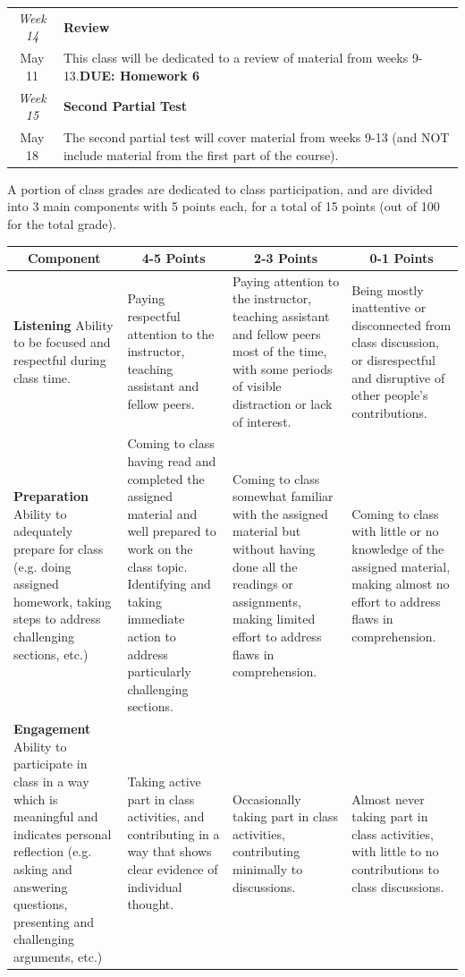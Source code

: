\documentclass[12pt]{article}
\begin{document}
\begin{tabularx}{\textwidth}[c]{| c X |}
	\textit{Week 14} & \textbf{Review} \\ May 11 & This class will be dedicated to a review of material from weeks 9-13.\newline \textbf{DUE: Homework 6}\\ \hline
	\textit{Week 15} & \textbf{Second Partial Test} \\ May 18 & The second partial test will cover material from weeks 9-13 (and NOT include material from the first part of the course).\\ \hline
\end{tabularx}
	

\clearpage

A portion of class grades are dedicated to class participation, and are divided into 3 main components with 5 points each, for a total of 15 points (out of 100 for the total grade). \newline

\noindent\begin{tabularx}{\textwidth}[c]{|X|X|X|X|}
\hline
 \multicolumn{1}{|c|}{\textbf{Component}} & \multicolumn{1}{c|}{\textbf{4-5 Points}} &  \multicolumn{1}{c|}{\textbf{2-3 Points}} &  \multicolumn{1}{c|}{\textbf{0-1 Points}}\\
\hline
\textbf{Listening} \newline Ability to be focused and respectful during class time. & Paying respectful attention to the instructor, teaching assistant and fellow peers. & Paying attention to the instructor, teaching assistant and fellow peers most of the time, with some periods of visible distraction or lack of interest. & Being mostly inattentive or disconnected from class discussion, or disrespectful and disruptive of other people's contributions.\\
\hline
\textbf{Preparation} \newline Ability to adequately prepare for class (e.g. doing assigned homework, taking steps to address challenging sections, etc.) & Coming to class having read and completed the assigned material and well prepared to work on the class topic. Identifying and taking immediate action to address particularly challenging sections. & Coming to class somewhat familiar with the assigned material but without having done all the readings or assignments, making limited effort to address flaws in comprehension. & Coming to class with little or no knowledge of the assigned material, making almost no effort to address flaws in comprehension.\\
\hline
\textbf{Engagement} \newline Ability to participate in class in a way which is meaningful and indicates personal reflection (e.g. asking and answering questions, presenting and challenging arguments, etc.) & Taking active part in class activities, and contributing in a way that shows clear evidence of individual thought. & Occasionally taking part in class activities, contributing minimally to discussions. & Almost never taking part in class activities, with little to no contributions to class discussions.\\
\hline
\end{tabularx}
\end{document}
